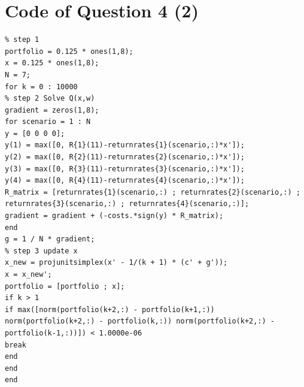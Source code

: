 \documentclass[11pt,a4paper]{article}
\begin{document}
\section*{Code of Question 4 (2)}
\begin{lstlisting}
% step 1 
portfolio = 0.125 * ones(1,8);
x = 0.125 * ones(1,8);
N = 7;
for k = 0 : 10000
% step 2 Solve Q(x,w)
gradient = zeros(1,8);
for scenario = 1 : N
y = [0 0 0 0];
y(1) = max([0, R{1}(11)-returnrates{1}(scenario,:)*x']);
y(2) = max([0, R{2}(11)-returnrates{2}(scenario,:)*x']);
y(3) = max([0, R{3}(11)-returnrates{3}(scenario,:)*x']);
y(4) = max([0, R{4}(11)-returnrates{4}(scenario,:)*x']);
R_matrix = [returnrates{1}(scenario,:) ; returnrates{2}(scenario,:) ; returnrates{3}(scenario,:) ; returnrates{4}(scenario,:)];
gradient = gradient + (-costs.*sign(y) * R_matrix);
end
g = 1 / N * gradient;
% step 3 update x
x_new = projunitsimplex(x' - 1/(k + 1) * (c' + g'));
x = x_new';
portfolio = [portfolio ; x];
if k > 1
if max([norm(portfolio(k+2,:) - portfolio(k+1,:)) norm(portfolio(k+2,:) - portfolio(k,:)) norm(portfolio(k+2,:) - portfolio(k-1,:))]) < 1.0000e-06
break
end
end
end
\end{lstlisting}
\end{document}
